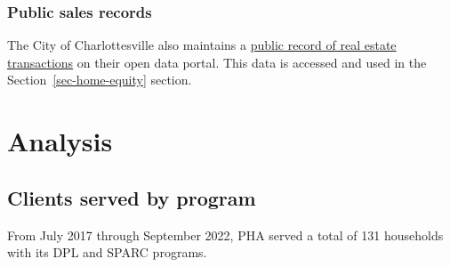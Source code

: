 \documentclass[
  letterpaper,
  DIV=11,
  numbers=noendperiod]{scrartcl}
\begin{document}
\hypertarget{public-sales-records}{%
\subsubsection{Public sales records}\label{public-sales-records}}

The City of Charlottesville also maintains a
\href{https://opendata.charlottesville.org/maps/real-estate-sales}{public
record of real estate transactions} on their open data portal. This data
is accessed and used in the Section~\ref{sec-home-equity} section.

\hypertarget{analysis}{%
\section{Analysis}\label{analysis}}

\hypertarget{clients-served-by-program}{%
\subsection{Clients served by program}\label{clients-served-by-program}}

From July 2017 through September 2022, PHA served a total of 131
households with its DPL and SPARC programs.
\end{document}
